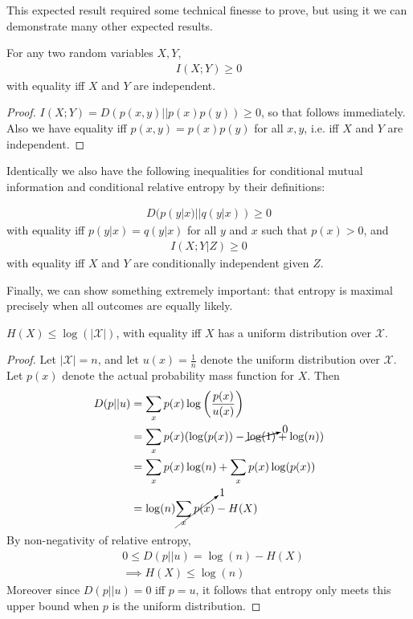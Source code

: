 This expected result required some technical finesse to prove, but using it we can demonstrate many other expected results.
\begin{corollary}
	For any two random variables $X,Y$,
	\begin{align}
		I(X;Y) \geq 0
	\end{align}
with equality iff $X$ and $Y$ are independent. 
\end{corollary}
\begin{proof}
	$I(X;Y) = D(p(x,y)||p(x)p(y)) \geq 0$, so that follows immediately. Also we have equality iff $p(x,y) = p(x)p(y)$ for all $x,y$, i.e. iff $X$ and $Y$ are independent.
\end{proof}
Identically we also have the following inequalities for conditional mutual information and conditional relative entropy by their definitions:
\begin{corollary}
\begin{align}
D(p(y|x)||q(y|x)) \geq 0 
\end{align}
	with equality iff $p(y|x) = q(y|x)$ for all $y$ and $x$ such that $p(x) > 0$, and 
\begin{align}
	I(X;Y|Z) \geq 0 
\end{align}
with equality iff $X$ and $Y$ are conditionally independent given $Z$.
\end{corollary}
Finally, we can show something extremely important: that entropy is maximal precisely when all outcomes are equally likely.
\begin{theorem}
	$H(X) \leq \log(|\mathcal{X}|)$, with equality iff $X$ has a uniform distribution over $\mathcal{X}$. 
\end{theorem}
\begin{proof}
	Let $|\mathcal{X}| = n$, and let $u(x) = \frac{1}{n}$ denote the uniform distribution over $\mathcal{X}$. Let $p(x)$ denote the actual probability mass function for $X$. Then
\begin{align}
	D(p||u) &= \sum_x p(x)\log\left(\frac{p(x)}{u(x)}\right) \\
			&= \sum_x p(x)(\log(p(x)) - \cancelto{0}{\log(1)} + \log(n)) \\
			&= \sum_x p(x)\log(n) + \sum_x p(x)\log(p(x)) \\
			&= \log(n)\cancelto{1}{\sum_x p(x)} - H(X)
\end{align}
By non-negativity of relative entropy, 
\begin{align}
	& 0 \leq D(p||u) = \log(n)-H(X) \\
	&\implies H(X) \leq \log(n)
\end{align}
Moreover since $D(p||u) = 0$ iff $p=u$, it follows that entropy only meets this upper bound when $p$ is the uniform distribution. 
\end{proof}
